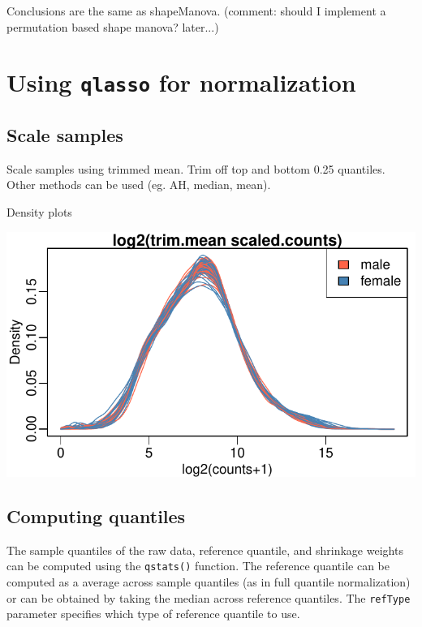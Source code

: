 \documentclass{article}\usepackage[]{graphicx}\usepackage[usenames,dvipsnames]{color}
\makeatletter
\def\maxwidth{ %
  \ifdim\Gin@nat@width>\linewidth
    \linewidth
  \else
    \Gin@nat@width
  \fi
}
\newenvironment{knitrout}{}{} %
\makeatother
\begin{document}
Conclusions are the same as shapeManova. 
(comment: should I implement a permutation based shape manova? later...)

\section{Using \texttt{qlasso} for normalization}

\subsection{Scale samples}
Scale samples using trimmed mean. Trim off top and bottom 0.25 quantiles.
Other methods can be used (eg. AH, median, mean).

Density plots
\begin{knitrout}
\color{fgcolor}

{\centering \includegraphics[width=\maxwidth]{figure/scale-counts-1} 

}



\end{knitrout}


\subsection{Computing quantiles}

The sample quantiles of the raw data, reference quantile, 
and shrinkage weights can be computed using the 
\texttt{qstats()} function. The reference quantile 
can be computed as a average across sample quantiles 
(as in full quantile normalization) or can be obtained
by taking the median across reference quantiles. 
The \texttt{refType} parameter specifies which type
of reference quantile to use.
\end{document}
